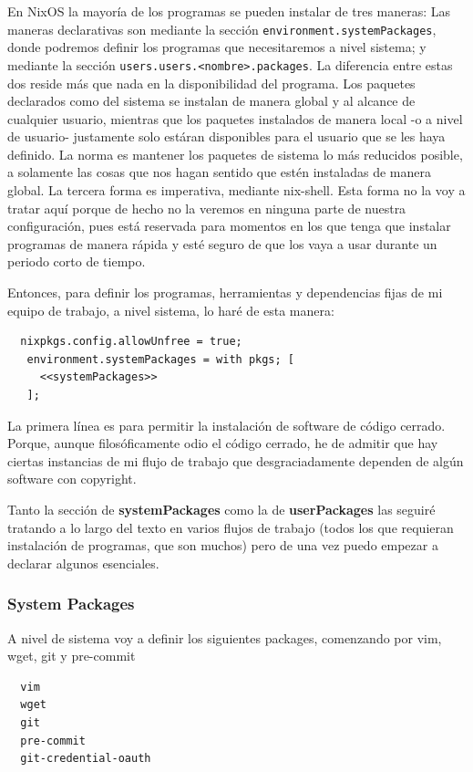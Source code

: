 \documentclass[11pt]{article}
\begin{document}
En NixOS la mayoría de los programas se pueden instalar de tres maneras: Las maneras declarativas son mediante la sección \texttt{environment.systemPackages}, donde podremos definir los programas que necesitaremos a nivel sistema; y mediante la sección \texttt{users.users.<nombre>.packages}.
La diferencia entre estas dos reside más que nada en la disponibilidad del programa. Los paquetes declarados como del sistema se instalan de manera global y al alcance de cualquier usuario, mientras que los paquetes instalados de manera local -o a nivel de usuario- justamente solo estáran disponibles para el usuario que se les haya definido. La norma es mantener los paquetes de sistema lo más reducidos posible, a solamente las cosas que nos hagan sentido que estén instaladas de manera global.
La tercera forma es imperativa, mediante nix-shell. Esta forma no la voy a tratar aquí porque de hecho no la veremos en ninguna parte de nuestra configuración, pues está reservada para momentos en los que tenga que instalar programas de manera rápida y esté seguro de que los vaya a usar durante un periodo corto de tiempo.

Entonces, para definir los programas, herramientas y dependencias fijas de mi equipo de trabajo, a nivel sistema, lo haré de esta manera:

\begin{verbatim}
  nixpkgs.config.allowUnfree = true;
   environment.systemPackages = with pkgs; [
     <<systemPackages>>
   ];
\end{verbatim}

La primera línea es para permitir la instalación de software de código cerrado. Porque, aunque filosóficamente odio el código cerrado, he de admitir que hay ciertas instancias de mi flujo de trabajo que desgraciadamente dependen de algún software con copyright.

Tanto la sección de \textbf{systemPackages} como la de \textbf{userPackages} las seguiré tratando a lo largo del texto en varios flujos de trabajo (todos los que requieran instalación de programas, que son muchos) pero de una vez puedo empezar a declarar algunos esenciales.
\subsubsection{System Packages}
\label{sec:org653f39a}

A nivel de sistema voy a definir los siguientes packages, comenzando por vim, wget, git y pre-commit

\begin{verbatim}
  vim
  wget
  git
  pre-commit
  git-credential-oauth
\end{verbatim}
\end{document}
